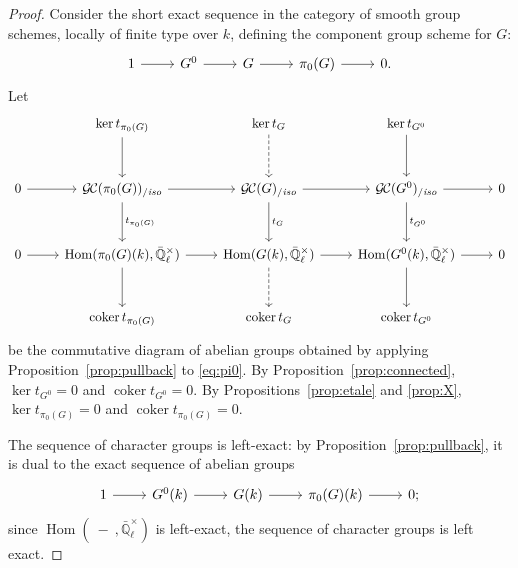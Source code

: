 \documentclass[11pt]{amsart}
\theoremstyle{plain}
\theoremstyle{definition}
\theoremstyle{remark}
\newcommand{\EE}{\mathbb{\bar Q}_\ell}
\newcommand{\Fq}{k}
\newcommand{\EEx}{\EE^\times}
\DeclareMathOperator{\Hom}{Hom}
\DeclareMathOperator{\coker}{coker}
\newcommand{\GC}{{\mathcal{G\hskip-0.8pt C}}}
\newcommand{\GCiso}[1]{\GC(#1)_{/\textit{iso}}}
\newcommand{\trFrob}[1]{t_{#1}}
\begin{document}
\begin{proof}
  Consider the short exact sequence in the category of smooth group
  schemes, locally of finite type over $\Fq$, defining the component
  group scheme for $G$:
  \begin{equation}\label{eq:pi0}
  \begin{tikzcd}
    1 \rar & G^0 \rar & G \rar & \pi_0(G) \rar & 0.
  \end{tikzcd}
  \end{equation}
  Let
  \[
  \begin{tikzcd}[row sep=30]
    {}& \ker t_{\pi_0(G)} \dar & \arrow[dashed]{d} \ker \trFrob{G} & \ker t_{G^0} \dar & \\
    0 \rar & \GCiso{\pi_0(G)} \rar \dar{t_{\pi_0(G)}}
    & \GCiso{G} \rar \dar{\trFrob{G}} & \GCiso{G^0} \rar \dar{t_{G^0}} & 0\\
    0 \rar & \Hom(\pi_0(G)(\Fq),\EEx) \rar \dar
    & \arrow[dashed]{d} \Hom(G(\Fq),\EEx) \rar & \Hom(G^0(\Fq),\EEx) \rar \dar & 0\\
    & \coker t_{\pi_0(G)} & \coker \trFrob{G} &  \coker t_{G^0} &
  \end{tikzcd}
  \]
  be the commutative diagram of abelian groups obtained by applying
  Proposition~\ref{prop:pullback} to \eqref{eq:pi0}.  By
  Proposition~\ref{prop:connected}, $\ker t_{G^0} =0$ and $\coker t_{G^0}=0$.
  By Propositions~\ref{prop:etale} and \ref{prop:X}, $\ker t_{\pi_0(G)}=0$
  and $\coker t_{\pi_0(G)}=0$.

  The sequence of character groups is left-exact: by
  Proposition~\ref{prop:pullback}, it is dual to the exact sequence of
  abelian groups
  \begin{equation}\label{eq:pi1}
  \begin{tikzcd}
    1 \rar & G^0(\Fq) \rar & G(\Fq) \rar & \pi_0(G)(\Fq) \rar & 0;
  \end{tikzcd}
  \end{equation}
  since $\Hom(\ - \ ,\EEx)$ is left-exact, the sequence of
  character groups is left exact.


\end{proof}
\end{document}
